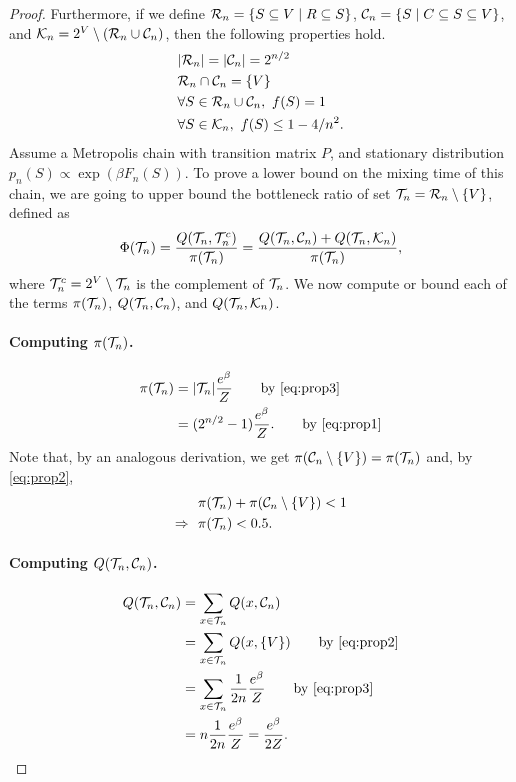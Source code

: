 \begin{proof}
Furthermore, if we define $\mathcal{R}_n = \{S \subseteq V \mid R \subseteq S\}$, $\mathcal{C}_n = \{S \mid C \subseteq S \subseteq V\}$, and $\mathcal{K}_n = 2^V \setminus (\mathcal{R}_n \cup \mathcal{C}_n)$, then the following properties hold.
\begin{align}
  &|\mathcal{R}_n| = |\mathcal{C}_n| = 2^{n/2} \label{eq:prop1} \\
  &\mathcal{R}_n \cap \mathcal{C}_n = \{V\} \label{eq:prop2} \\
  &\forall S \in \mathcal{R}_n\cup\mathcal{C}_n,\ f(S) = 1 \label{eq:prop3} \\
  &\forall S \in \mathcal{K}_n,\ f(S) \leq 1 - 4/n^2 \label{eq:prop4}.
\end{align}
Assume a Metropolis chain with transition matrix $P$, and stationary distribution $p_n(S) \propto \exp(\beta F_n(S))$.
To prove a lower bound on the mixing time of this chain, we are going to upper bound the bottleneck ratio \citep[Ch. 7]{levin08} of set $\mathcal{T}_n = \mathcal{R}_n \setminus \{V\}$, defined as
\begin{align*}
  \Phi(\mathcal{T}_n) = \frac{Q(\mathcal{T}_n, \mathcal{T}_n^c)}{\pi(\mathcal{T}_n)} = \frac{Q(\mathcal{T}_n, \mathcal{C}_n) + Q(\mathcal{T}_n, \mathcal{K}_n)}{\pi(\mathcal{T}_n)},
\end{align*}
where $\mathcal{T}_n^c = 2^V \setminus \mathcal{T}_n$ is the complement of $\mathcal{T}_n$. We now compute or bound each of the terms $\pi(\mathcal{T}_n)$, $Q(\mathcal{T}_n, \mathcal{C}_n)$, and $Q(\mathcal{T}_n, \mathcal{K}_n)$.

\paragraph{Computing $\pi(\mathcal{T}_n)$.}
\begin{align*}
  \pi(\htn) &= |\htn| \frac{e^{\beta}}{Z} \tag*{by \eqref{eq:prop3}} \\
         &= (2^{n/2} - 1) \frac{e^{\beta}}{Z}. \tag*{by \eqref{eq:prop1}}
\end{align*}
Note that, by an analogous derivation, we get $\pi(\mathcal{C}_n \setminus \{V\}) = \pi(\mathcal{T}_n)$ and, by \eqref{eq:prop2},
\begin{align*}
  &\pi(\mathcal{T}_n) + \pi(\mathcal{C}_n \setminus \{V\}) < 1 \\
  \Rightarrow\ \ &\pi(\mathcal{T}_n) < 0.5.
\end{align*}
  
\paragraph{Computing $Q(\mathcal{T}_n, \mathcal{C}_n)$.}
\begin{align*}
  Q(\htn, \hcn) &= \sum_{x \in \htn} Q(x, \hcn) \\
                &= \sum_{x \in \htn} Q(x, \{V\}) \tag*{by \eqref{eq:prop2}} \\
                &= \sum_{x \in \htn} \frac{1}{2n} \frac{e^{\beta}}{Z} \tag*{by \eqref{eq:prop3}} \\
                &= n \frac{1}{2n} \frac{e^{\beta}}{Z} = \frac{e^{\beta}}{2Z}.
\end{align*}
    

\end{proof}
